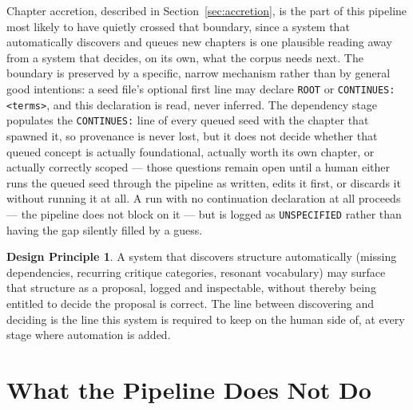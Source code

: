 \documentclass[11pt]{article}
\theoremstyle{definition}
\newtheorem{principle}{Design Principle}
\begin{document}
Chapter accretion, described in Section~\ref{sec:accretion}, is the
part of this pipeline most likely to have quietly crossed that
boundary, since a system that automatically discovers and queues new
chapters is one plausible reading away from a system that decides, on
its own, what the corpus needs next. The boundary is preserved by a
specific, narrow mechanism rather than by general good intentions: a
seed file's optional first line may declare \texttt{ROOT} or
\texttt{CONTINUES: <terms>}, and this declaration is read, never
inferred. The dependency stage populates the \texttt{CONTINUES:} line
of every queued seed with the chapter that spawned it, so provenance is
never lost, but it does not decide whether that queued concept is
actually foundational, actually worth its own chapter, or actually
correctly scoped --- those questions remain open until a human either
runs the queued seed through the pipeline as written, edits it first,
or discards it without running it at all. A run with no continuation
declaration at all proceeds --- the pipeline does not block on it ---
but is logged as \texttt{UNSPECIFIED} rather than having the gap
silently filled by a guess.

\begin{principle}
A system that discovers structure automatically (missing dependencies,
recurring critique categories, resonant vocabulary) may surface that
structure as a proposal, logged and inspectable, without thereby being
entitled to decide the proposal is correct. The line between
discovering and deciding is the line this system is required to keep
on the human side of, at every stage where automation is added.
\end{principle}

\section{What the Pipeline Does Not Do}
\label{sec:not-do}
\end{document}
